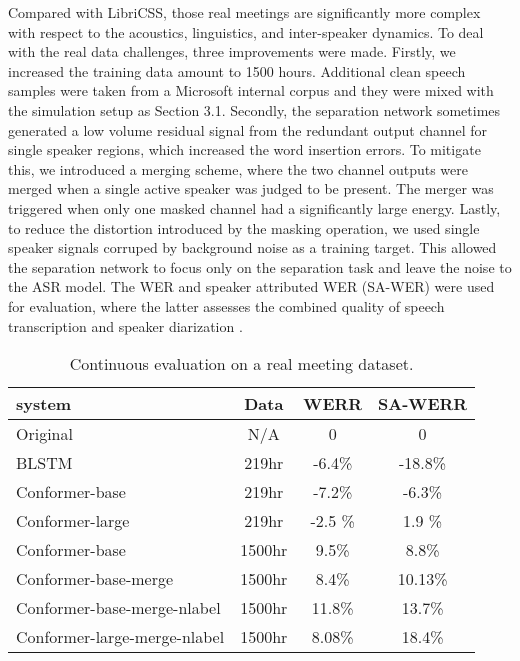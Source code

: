 \documentclass{article}
\begin{document}
	Compared with LibriCSS, those real meetings are significantly more complex with respect to the acoustics, linguistics, and inter-speaker dynamics. To deal with the real data challenges, 
	three improvements were made. Firstly, we increased the training data amount to 1500 hours.
	Additional clean speech samples were taken from a Microsoft internal corpus and they were mixed with the simulation setup as Section 3.1. 
	Secondly, the separation network sometimes generated a low volume residual signal from the redundant output channel for single speaker regions, which increased the word insertion errors. To mitigate this, we introduced a merging scheme, where the two channel outputs were merged when a single active speaker was judged to be present. 
The merger was triggered when only one masked channel had a significantly large energy. Lastly, to reduce the distortion introduced by the masking operation, we used single speaker signals corruped by background noise as a training target. This allowed the separation network to focus only on the separation task and leave the noise to the ASR model. 
	The WER and speaker attributed WER (SA-WER) were used for evaluation, where the latter assesses the combined quality of speech transcription and  speaker diarization \cite{yoshioka2019advances}.
	
	
	\begin{table}[!h]
		\centering
		\caption{Continuous evaluation on a real meeting dataset.}
		\label{tab:prod}


\begin{tabular}{l|c|cc}
			\toprule
			\textbf{system}& Data & WERR & SA-WERR   \\ 	
			\midrule
			Original  & N/A & 0 & 0 \\
			BLSTM & 219hr & -6.4\% & -18.8\% \\
			Conformer-base & 219hr & -7.2\% & -6.3\% \\
			Conformer-large& 219hr & -2.5 \% & 1.9 \% \\
			Conformer-base &1500hr & 9.5\% & 8.8\% \\
			Conformer-base-merge& 1500hr & 8.4\% & 10.13\% \\
			Conformer-base-merge-nlabel& 1500hr & 11.8\% & 13.7\% \\
			Conformer-large-merge-nlabel & 1500hr & 8.08\% & 18.4\% \\
			\bottomrule
		\end{tabular}
		
	\end{table}	
	
\end{document}
